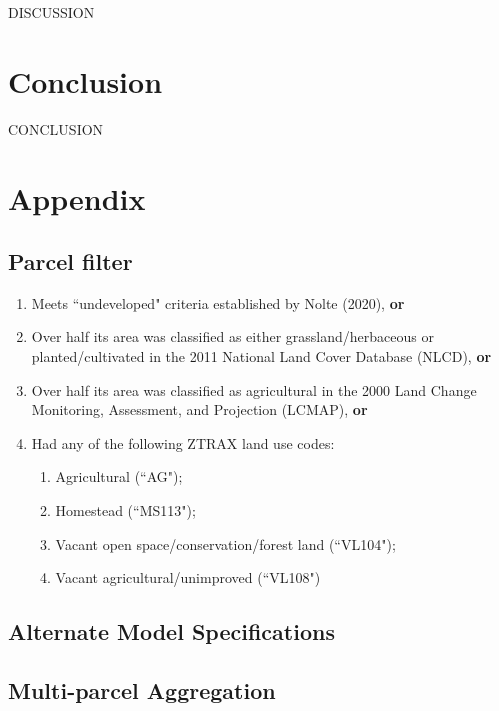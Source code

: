 \documentclass[12pt]{article}
\begin{document}
DISCUSSION

\newpage

\section{Conclusion}

CONCLUSION

\newpage

\section{Appendix}


\subsection{Parcel filter}

\begin{enumerate}
    \item Meets ``undeveloped" criteria established by Nolte (2020), \textbf{or}
    \item Over half its area was classified as either grassland/herbaceous or planted/cultivated in the 2011 National Land Cover Database (NLCD), \textbf{or}
    \item Over half its area was classified as agricultural in the 2000 Land Change Monitoring, Assessment, and Projection (LCMAP), \textbf{or}
    \item Had any of the following ZTRAX land use codes:
    \begin{enumerate}
        \item Agricultural (``AG");
        \item Homestead (``MS113");
        \item Vacant open space/conservation/forest land (``VL104");
        \item Vacant agricultural/unimproved (``VL108")
    \end{enumerate}
\end{enumerate}

\subsection{Alternate Model Specifications}


\subsection{Multi-parcel Aggregation}



\newpage


\printbibliography
\end{document}
